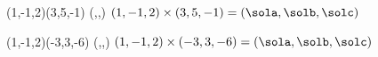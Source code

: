 \CROSSPRODUCT(1,-1,2)(3,5,-1)%
             (\sola,\solb,\solc)
$(1,-1,2)\times(3,5,-1)=(\sola,\solb,\solc)$

\VECTORPRODUCT(1,-1,2)(-3,3,-6)%
             (\sola,\solb,\solc)
$(1,-1,2)\times(-3,3,-6)=(\sola,\solb,\solc)$


